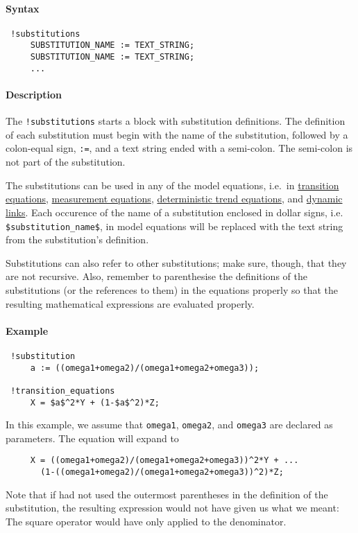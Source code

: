 


	\paragraph{Syntax}
 
 \begin{verbatim}
 !substitutions
     SUBSTITUTION_NAME := TEXT_STRING;
     SUBSTITUTION_NAME := TEXT_STRING;
     ...
 \end{verbatim}
 
 \paragraph{Description}
 
 The \texttt{!substitutions} starts a block with substitution
 definitions. The definition of each substitution must begin with the
 name of the substitution, followed by a colon-equal sign, \texttt{:=},
 and a text string ended with a semi-colon. The semi-colon is not part of
 the substitution.
 
 The substitutions can be used in any of the model equations, i.e.~in
 \href{modellang/transitionequations}{transition equations},
 \href{modellang/measurementequations}{measurement equations},
 \href{modellang/dtrends}{deterministic trend equations}, and
 \href{modellang/links}{dynamic links}. Each occurence of the name of a
 substitution enclosed in dollar signs, i.e.
 \texttt{\$substitution\_name\$}, in model equations will be replaced
 with the text string from the substitution's definition.
 
 Substitutions can also refer to other substitutions; make sure, though,
 that they are not recursive. Also, remember to parenthesise the
 definitions of the substitutions (or the references to them) in the
 equations properly so that the resulting mathematical expressions are
 evaluated properly.
 
 \paragraph{Example}
 
 \begin{verbatim}
 !substitution
     a := ((omega1+omega2)/(omega1+omega2+omega3));
 
 !transition_equations
     X = $a$^2*Y + (1-$a$^2)*Z;
 \end{verbatim}
 
 In this example, we assume that \texttt{omega1}, \texttt{omega2}, and
 \texttt{omega3} are declared as parameters. The equation will expand to
 
 \begin{verbatim}
     X = ((omega1+omega2)/(omega1+omega2+omega3))^2*Y + ...
       (1-((omega1+omega2)/(omega1+omega2+omega3))^2)*Z;
 \end{verbatim}
 
 Note that if had not used the outermost parentheses in the definition of
 the substitution, the resulting expression would not have given us what
 we meant: The square operator would have only applied to the
 denominator.


